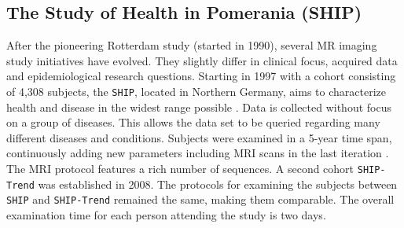 \documentclass[journal]{style/vgtc} 			          %
\begin{document}
\subsection{The Study of Health in Pomerania (SHIP)}
After the pioneering Rotterdam study (started in 1990), several MR imaging study initiatives have evolved.
%
They slightly differ in clinical focus, acquired data and epidemiological research questions.
%
Starting in 1997 with a cohort consisting of 4,308 subjects, the \texttt{SHIP}, located in Northern Germany, aims to characterize health and disease in the widest range possible \cite{Volzke2011}.
%
Data is collected without focus on a group of diseases.
%
This allows the data set to be queried regarding many different diseases and conditions.
%
Subjects were examined in a 5-year time span, continuously adding new parameters including MRI scans in the last iteration \cite{Hegenscheid2009}.
%
The MRI protocol features a rich number of sequences.
%
A second cohort \texttt{SHIP-Trend} was established in 2008.
%
The protocols for examining the subjects between \texttt{SHIP} and \texttt{SHIP-Trend} remained the same, making them comparable.
%
The overall examination time for each person attending the study is two days.
\end{document}
